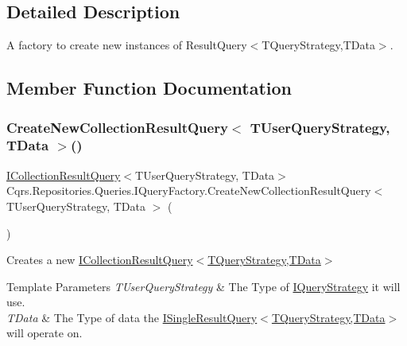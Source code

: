 \subsection{Detailed Description}
A factory to create new instances of Result\+Query$<$\+T\+Query\+Strategy,\+T\+Data$>$. 



\subsection{Member Function Documentation}
\mbox{\label{interfaceCqrs_1_1Repositories_1_1Queries_1_1IQueryFactory_af8b443851e8112dc70cbc7fe32029ccb_af8b443851e8112dc70cbc7fe32029ccb}} 
\subsubsection{\texorpdfstring{Create\+New\+Collection\+Result\+Query$<$ T\+User\+Query\+Strategy, T\+Data $>$()}{CreateNewCollectionResultQuery< TUserQueryStrategy, TData >()}}
{\footnotesize\ttfamily \hyperlink{interfaceCqrs_1_1Repositories_1_1Queries_1_1ICollectionResultQuery}{I\+Collection\+Result\+Query}$<$T\+User\+Query\+Strategy, T\+Data$>$ Cqrs.\+Repositories.\+Queries.\+I\+Query\+Factory.\+Create\+New\+Collection\+Result\+Query$<$ T\+User\+Query\+Strategy, T\+Data $>$ (\begin{DoxyParamCaption}{ }\end{DoxyParamCaption})}



Creates a new \hyperlink{interfaceCqrs_1_1Repositories_1_1Queries_1_1ICollectionResultQuery}{I\+Collection\+Result\+Query$<$\+T\+Query\+Strategy,\+T\+Data$>$} 


\begin{DoxyTemplParams}{Template Parameters}
{\em T\+User\+Query\+Strategy} & The Type of \hyperlink{interfaceCqrs_1_1Repositories_1_1Queries_1_1IQueryStrategy}{I\+Query\+Strategy} it will use.\\
\hline
{\em T\+Data} & The Type of data the \hyperlink{interfaceCqrs_1_1Repositories_1_1Queries_1_1ISingleResultQuery}{I\+Single\+Result\+Query$<$\+T\+Query\+Strategy,\+T\+Data$>$} will operate on.\\
\hline
\end{DoxyTemplParams}


